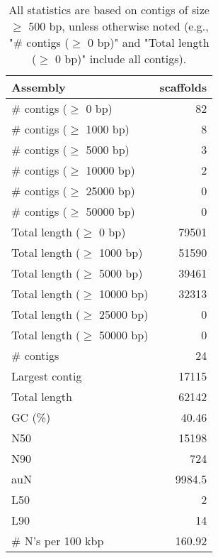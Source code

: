 \documentclass[12pt,a4paper]{article}
\begin{document}
\begin{table}[ht]
\begin{center}
\caption{All statistics are based on contigs of size $\geq$ 500 bp, unless otherwise noted (e.g., "\# contigs ($\geq$ 0 bp)" and "Total length ($\geq$ 0 bp)" include all contigs).}
\begin{tabular}{|l*{1}{|r}|}
\hline
Assembly & scaffolds \\ \hline
\# contigs ($\geq$ 0 bp) & 82 \\ \hline
\# contigs ($\geq$ 1000 bp) & 8 \\ \hline
\# contigs ($\geq$ 5000 bp) & 3 \\ \hline
\# contigs ($\geq$ 10000 bp) & 2 \\ \hline
\# contigs ($\geq$ 25000 bp) & 0 \\ \hline
\# contigs ($\geq$ 50000 bp) & 0 \\ \hline
Total length ($\geq$ 0 bp) & 79501 \\ \hline
Total length ($\geq$ 1000 bp) & 51590 \\ \hline
Total length ($\geq$ 5000 bp) & 39461 \\ \hline
Total length ($\geq$ 10000 bp) & 32313 \\ \hline
Total length ($\geq$ 25000 bp) & 0 \\ \hline
Total length ($\geq$ 50000 bp) & 0 \\ \hline
\# contigs & 24 \\ \hline
Largest contig & 17115 \\ \hline
Total length & 62142 \\ \hline
GC (\%) & 40.46 \\ \hline
N50 & 15198 \\ \hline
N90 & 724 \\ \hline
auN & 9984.5 \\ \hline
L50 & 2 \\ \hline
L90 & 14 \\ \hline
\# N's per 100 kbp & 160.92 \\ \hline
\end{tabular}
\end{center}
\end{table}
\end{document}
